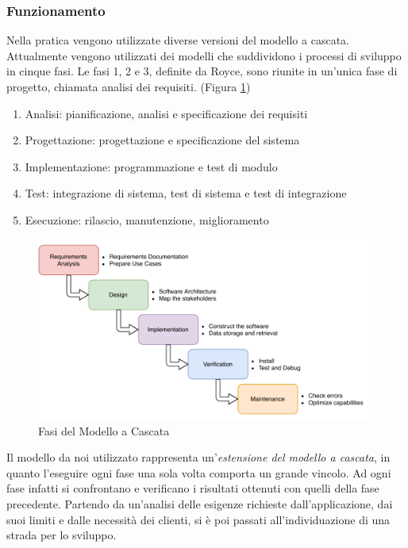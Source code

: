 \subsubsection{Funzionamento}
Nella pratica vengono utilizzate diverse versioni del modello a cascata. Attualmente vengono utilizzati dei modelli che suddividono i processi di sviluppo in cinque fasi. Le fasi 1, 2 e 3, definite da Royce, sono riunite in un’unica fase di progetto, chiamata analisi dei requisiti. (Figura \ref{fig:waterfallmodel})
\begin{enumerate}
    \item Analisi: pianificazione, analisi e specificazione dei requisiti
    \item Progettazione: progettazione e specificazione del sistema
    \item Implementazione: programmazione e test di modulo
    \item Test: integrazione di sistema, test di sistema e test di integrazione
    \item Esecuzione: rilascio, manutenzione, miglioramento
\end{enumerate}
\begin{figure}
    \centering
    \includegraphics[width=0.98\textwidth]{images/02_5_waterfall_model.pdf}
    \caption{Fasi del Modello a Cascata}
    \label{fig:waterfallmodel}
\end{figure}
Il modello da noi utilizzato rappresenta un'\textit{estensione del modello a cascata}, in quanto l'eseguire ogni fase una sola volta comporta un grande vincolo. Ad ogni fase infatti si confrontano e verificano i risultati ottenuti con quelli della fase precedente. Partendo da un'analisi delle esigenze richieste dall'applicazione, dai suoi limiti e dalle necessità dei clienti, si è poi passati all'individuazione di una strada per lo sviluppo.

